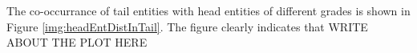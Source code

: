 The co-occurrance of tail entities with head entities of different grades is shown in 
Figure \ref{img:headEntDistInTail}. The figure clearly indicates that 
WRITE ABOUT THE PLOT HERE

 







